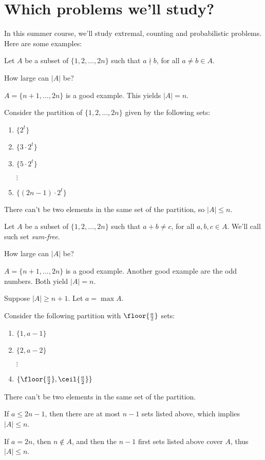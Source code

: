 
\section{Which problems we'll study?}

In this summer course, we'll study extremal, counting and probabilistic problems. Here are some examples:

\begin{prob}
	Let $A$ be a subset of $\{1, 2, \dots, 2n\}$ such that $a \nmid b$, for all $a \neq b \in A$.

	How large can $|A|$ be?
\end{prob}

\begin{sol}
	$A = \{n+1, \dots, 2n\}$ is a good example. This yields $|A| = n$.

	Consider the partition of $\{1, 2, \dots, 2n\}$ given by the following sets:
	\begin{enumerate}[label = \textbullet]
		\item $\{2^t\}$
		\item $\{3 \cdot 2^t\}$
		\item $\{5 \cdot 2^t\}$
		\item[$\vdots$]
		\item $\{(2n-1) \cdot 2^t\}$
	\end{enumerate}

	There can't be two elements in the same set of the partition, so $|A| \le n$. 
\end{sol}

\begin{prob}
	Let $A$ be a subset of $\{1, 2, \dots, 2n\}$ such that $a + b \neq c$, for all $a, b, c \in A$. We'll call such set \emph{sum-free}.

	How large can $|A|$ be?
\end{prob}

\begin{sol}	
	$A = \{n+1, \dots, 2n\}$ is a good example. Another good example are the odd numbers. Both yield $|A| = n$.

	Suppose $|A| \ge n+1$. Let $a = \max A$.

	Consider the following partition with $\floor{\frac{a}{2}}$ sets:
	\begin{enumerate}[label = \textbullet]
		\item $\{1, a-1\}$
		\item $\{2, a-2\}$
		\item[$\vdots$]
		\item $\{\floor{\frac{a}{2}}, \ceil{\frac{a}{2}}\}$
	\end{enumerate}

	There can't be two elements in the same set of the partition.

	If $a \le 2n-1$, then there are at most $n - 1$ sets listed above, which implies $|A| \le n$.

	If $a = 2n$, then $n \not\in A$, and then the $n-1$ first sets listed above cover $A$, thus $|A| \le n$.
\end{sol}

